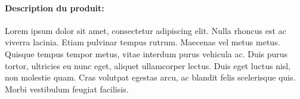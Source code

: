 \documentclass[a4paper,10pt]{article}
\begin{document}
\begin{xcalctab}
\normalfont







\end{xcalctab}


\vspace{\rsespaceVertical}


\paragraph*{Description du produit:}
 Lorem ipsum dolor sit amet, consectetur adipiscing elit. Nulla rhoncus est ac viverra lacinia. Etiam pulvinar tempus rutrum. Maecenas vel metus metus. Quisque tempus tempor metus, vitae interdum purus vehicula ac. Duis purus tortor, ultricies eu nunc eget, aliquet ullamcorper lectus. Duis eget luctus nisl, non molestie quam. Cras volutpat egestas arcu, ac blandit felis scelerisque quis. Morbi vestibulum feugiat facilisis.
\end{document}
